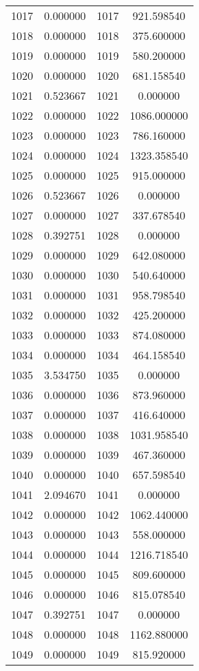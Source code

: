 \documentclass[12pt]{article}
\begin{document}
\begin{longtable}{@{}cccc@{}}
1017 & 0.000000 & 1017 & 921.598540 \\
1018 & 0.000000 & 1018 & 375.600000 \\
1019 & 0.000000 & 1019 & 580.200000 \\
1020 & 0.000000 & 1020 & 681.158540 \\
1021 & 0.523667 & 1021 & 0.000000 \\
1022 & 0.000000 & 1022 & 1086.000000 \\
1023 & 0.000000 & 1023 & 786.160000 \\
1024 & 0.000000 & 1024 & 1323.358540 \\
1025 & 0.000000 & 1025 & 915.000000 \\
1026 & 0.523667 & 1026 & 0.000000 \\
1027 & 0.000000 & 1027 & 337.678540 \\
1028 & 0.392751 & 1028 & 0.000000 \\
1029 & 0.000000 & 1029 & 642.080000 \\
1030 & 0.000000 & 1030 & 540.640000 \\
1031 & 0.000000 & 1031 & 958.798540 \\
1032 & 0.000000 & 1032 & 425.200000 \\
1033 & 0.000000 & 1033 & 874.080000 \\
1034 & 0.000000 & 1034 & 464.158540 \\
1035 & 3.534750 & 1035 & 0.000000 \\
1036 & 0.000000 & 1036 & 873.960000 \\
1037 & 0.000000 & 1037 & 416.640000 \\
1038 & 0.000000 & 1038 & 1031.958540 \\
1039 & 0.000000 & 1039 & 467.360000 \\
1040 & 0.000000 & 1040 & 657.598540 \\
1041 & 2.094670 & 1041 & 0.000000 \\
1042 & 0.000000 & 1042 & 1062.440000 \\
1043 & 0.000000 & 1043 & 558.000000 \\
1044 & 0.000000 & 1044 & 1216.718540 \\
1045 & 0.000000 & 1045 & 809.600000 \\
1046 & 0.000000 & 1046 & 815.078540 \\
1047 & 0.392751 & 1047 & 0.000000 \\
1048 & 0.000000 & 1048 & 1162.880000 \\
1049 & 0.000000 & 1049 & 815.920000 \\

\end{longtable}
\end{document}

